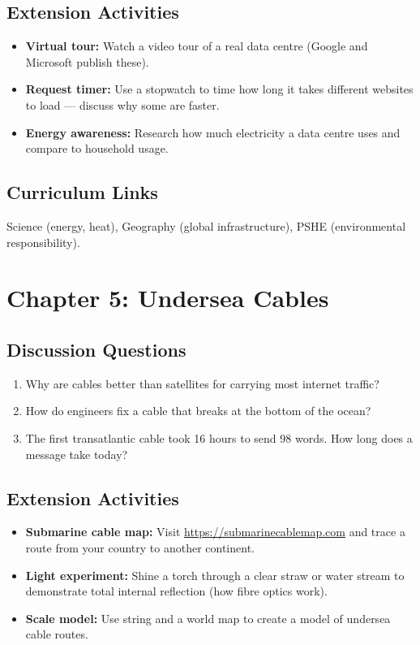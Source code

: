 \subsection*{Extension Activities}
\begin{itemize}
  \item \textbf{Virtual tour:} Watch a video tour of a real data centre (Google and Microsoft publish these).
  \item \textbf{Request timer:} Use a stopwatch to time how long it takes different websites to load — discuss why some are faster.
  \item \textbf{Energy awareness:} Research how much electricity a data centre uses and compare to household usage.
\end{itemize}

\subsection*{Curriculum Links}
Science (energy, heat), Geography (global infrastructure), PSHE (environmental responsibility).

\sectionrule

\section*{Chapter 5: Undersea Cables}

\subsection*{Discussion Questions}
\begin{enumerate}
  \item Why are cables better than satellites for carrying most internet traffic?
  \item How do engineers fix a cable that breaks at the bottom of the ocean?
  \item The first transatlantic cable took 16 hours to send 98 words. How long does a message take today?
\end{enumerate}

\subsection*{Extension Activities}
\begin{itemize}
  \item \textbf{Submarine cable map:} Visit \url{https://submarinecablemap.com} and trace a route from your country to another continent.
  \item \textbf{Light experiment:} Shine a torch through a clear straw or water stream to demonstrate total internal reflection (how fibre optics work).
  \item \textbf{Scale model:} Use string and a world map to create a model of undersea cable routes.
\end{itemize}

